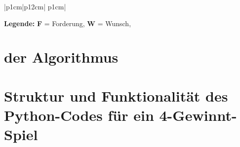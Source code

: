 \begin{table}[h]
\begin{tabular}{|p{1cm}|p{12cm}| p{1cm}|}


	\end{tabular}
	\begin{minipage}{0.5\linewidth}
		\small
		\textbf{Legende:} \textbf{F} = Forderung, \textbf{W} = Wunsch,
	\end{minipage}
	
\end{table}

\section{der Algorithmus}
\section*{Struktur und Funktionalität des Python-Codes für ein 4-Gewinnt-Spiel}

